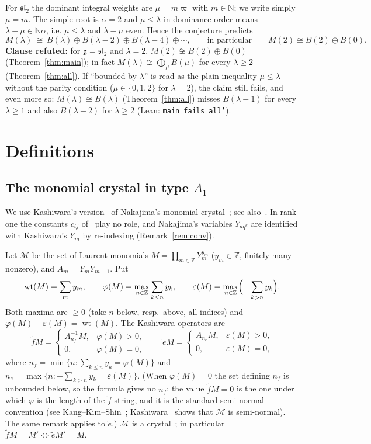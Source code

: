 \documentclass[11pt]{article}
\theoremstyle{definition}
\theoremstyle{remark}
\newcommand{\et}{\tilde e}
\newcommand{\ft}{\tilde f}
\newcommand{\wt}{\operatorname{wt}}
\begin{document}
For $\mathfrak{sl}_2$ the dominant integral weights are $\mu=m\varpi$ with
$m\in\mathbb N$; we write simply $\mu=m$. The simple root is $\alpha=2$ and
$\mu\le\lambda$ in dominance order means $\lambda-\mu\in\mathbb N\alpha$, i.e.
$\mu\le\lambda$ and $\lambda-\mu$ even. Hence the conjecture predicts
\[
M(\lambda)\ \cong\ B(\lambda)\oplus B(\lambda-2)\oplus B(\lambda-4)\oplus\cdots,
\qquad\text{in particular}\qquad M(2)\cong B(2)\oplus B(0).
\]
\textbf{Clause refuted:} for $\mathfrak g=\mathfrak{sl}_2$ and $\lambda=2$,
$M(2)\not\cong B(2)\oplus B(0)$ (Theorem~\ref{thm:main}); in fact
$M(\lambda)\not\cong\bigoplus_{\mu}B(\mu)$ for every $\lambda\ge2$
(Theorem~\ref{thm:all}).
If ``bounded by $\lambda$'' is read as the plain inequality $\mu\le\lambda$
without the parity condition ($\mu\in\{0,1,2\}$ for $\lambda=2$), the claim
still fails, and even more so: $M(\lambda)\cong B(\lambda)$ (Theorem~\ref{thm:all})
misses $B(\lambda-1)$ for every $\lambda\ge1$ and also $B(\lambda-2)$ for $\lambda\ge2$
(Lean: \texttt{main\_fails\_all'}).

\section{Definitions}
\subsection{The monomial crystal in type \texorpdfstring{$A_1$}{A1}}
We use Kashiwara's version~\cite{kas} of Nakajima's monomial
crystal~\cite{nak}; see also~\cite{kks}. In rank one the constants $c_{ij}$
of~\cite{kas} play no role, and Nakajima's variables $Y_{aq^{k}}$ are identified
with Kashiwara's $Y_m$ by re-indexing (Remark~\ref{rem:conv}).

Let $\mathcal M$ be the set of Laurent monomials $M=\prod_{m\in\mathbb Z}Y_m^{y_m}$
($y_m\in\mathbb Z$, finitely many nonzero), and $A_m=Y_mY_{m+1}$. Put
\[
\wt(M)=\sum_m y_m,\qquad
\varphi(M)=\max_{n\in\mathbb Z}\sum_{k\le n}y_k,\qquad
\varepsilon(M)=\max_{n\in\mathbb Z}\Bigl(-\sum_{k>n}y_k\Bigr).
\]
Both maxima are $\ge0$ (take $n$ below, resp.\ above, all indices) and
$\varphi(M)-\varepsilon(M)=\wt(M)$. The Kashiwara operators are
\[
\ft M=\begin{cases}A_{n_f}^{-1}M,& \varphi(M)>0,\\ 0,&\varphi(M)=0,\end{cases}
\qquad
\et M=\begin{cases}A_{n_e}M,& \varepsilon(M)>0,\\ 0,&\varepsilon(M)=0,\end{cases}
\]
where $n_f=\min\{n:\sum_{k\le n}y_k=\varphi(M)\}$ and
$n_e=\max\{n:-\sum_{k>n}y_k=\varepsilon(M)\}$. (When $\varphi(M)=0$ the set
defining $n_f$ is unbounded below, so the formula gives no $n_f$; the value
$\ft M=0$ is the one under which $\varphi$ is the length of the $\ft$-string,
and it is the standard semi-normal convention (see Kang--Kim--Shin~\cite{kks};
Kashiwara~\cite{kas} shows that $\mathcal M$ is semi-normal). The same remark
applies to $\et$.) $\mathcal M$ is a crystal~\cite{kas}; in particular
$\ft M=M'\iff \et M'=M$.
\end{document}
